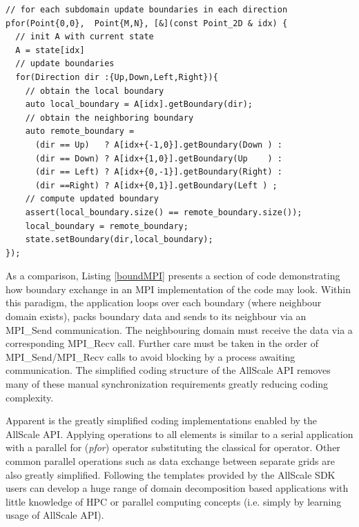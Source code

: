 \documentclass[conference,compsoc]{IEEEtran}
\begin{document}
\begin{lstlisting}[caption=AllScale boundary exchange implementation, label=boundAllScale]
// for each subdomain update boundaries in each direction
pfor(Point{0,0},  Point{M,N}, [&](const Point_2D & idx) {
  // init A with current state
  A = state[idx]
  // update boundaries
  for(Direction dir :{Up,Down,Left,Right}){
    // obtain the local boundary
    auto local_boundary = A[idx].getBoundary(dir);
    // obtain the neighboring boundary
    auto remote_boundary =
      (dir == Up)   ? A[idx+{-1,0}].getBoundary(Down ) :
      (dir == Down) ? A[idx+{1,0}].getBoundary(Up    ) :
      (dir == Left) ? A[idx+{0,-1}].getBoundary(Right) :
      (dir ==Right) ? A[idx+{0,1}].getBoundary(Left ) ;
    // compute updated boundary
    assert(local_boundary.size() == remote_boundary.size());
    local_boundary = remote_boundary;
    state.setBoundary(dir,local_boundary);
});
\end{lstlisting}

As a comparison, Listing \ref{boundMPI} presents a section of code demonstrating how boundary exchange in an MPI implementation of the code may look. Within this paradigm, the application loops over each boundary (where neighbour domain exists), packs boundary data and sends to its neighbour via an MPI\_Send communication. The neighbouring domain must receive the data  via a  corresponding MPI\_Recv call. Further care must be taken in the order of MPI\_Send/MPI\_Recv calls to avoid blocking by a process awaiting communication. The simplified coding structure of the AllScale API removes many of these manual synchronization requirements greatly reducing coding complexity.

Apparent is the greatly simplified coding implementations enabled by the AllScale API. Applying operations to all elements is similar to a serial application with a parallel for (\textit{pfor}) operator substituting the classical for operator. Other common parallel operations such as data exchange between separate grids are also greatly simplified. Following the templates provided by the AllScale SDK users can develop a huge range of domain decomposition based applications with little knowledge of HPC or parallel computing concepts (i.e. simply by learning usage of AllScale API). 
\end{document}
